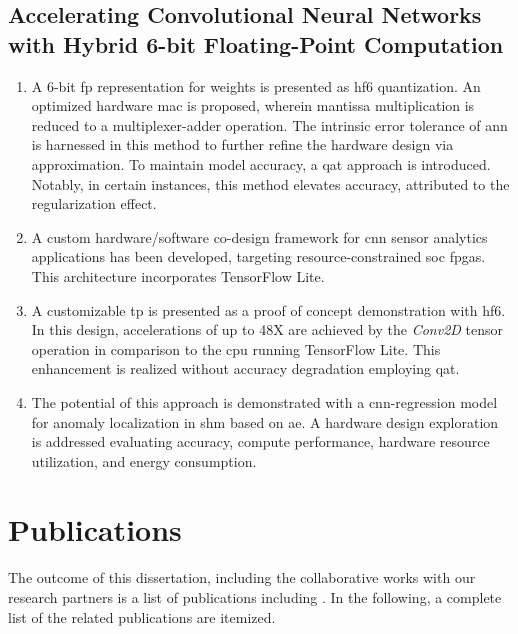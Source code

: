 \subsection{Accelerating Convolutional Neural Networks with Hybrid 6-bit Floating-Point Computation}
\begin{enumerate}
	\item A 6-bit \gls{fp} representation for weights is presented as \gls{hf6} quantization. An optimized hardware \gls{mac} is proposed, wherein mantissa multiplication is reduced to a multiplexer-adder operation. The intrinsic error tolerance of \gls{ann} is harnessed in this method to further refine the hardware design via approximation. To maintain model accuracy, a \gls{qat} approach is introduced. Notably, in certain instances, this method elevates accuracy, attributed to the regularization effect.
	
	\item A custom hardware/software co-design framework for \gls{cnn} sensor analytics applications has been developed, targeting resource-constrained \gls{soc} \glspl{fpga}. This architecture incorporates TensorFlow Lite.
	
	\item A customizable \gls{tp} is presented as a proof of concept demonstration with \gls{hf6}. In this design, accelerations of up to 48X are achieved by the \emph{Conv2D} tensor operation in comparison to the \gls{cpu} running TensorFlow Lite. This enhancement is realized without accuracy degradation employing \gls{qat}.
	
	\item The potential of this approach is demonstrated with a \gls{cnn}-regression model for anomaly localization in \gls{shm} based on \gls{ae}. A hardware design exploration is addressed evaluating accuracy, compute performance, hardware resource utilization, and energy consumption.
\end{enumerate}

\section{Publications}
The outcome of this dissertation, including the collaborative works with our research partners is a list of publications including \cite{nevarez2020accelerator, nevarez2021accelerating, yn2022cnnsensor}. In the following, a complete list of the related publications are itemized.

